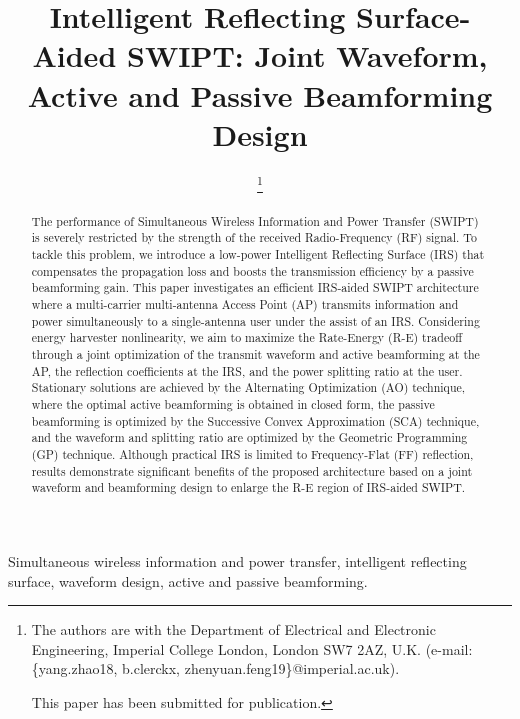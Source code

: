 \documentclass[journal]{IEEEtran}
\begin{document}
	\title{Intelligent Reflecting Surface-Aided SWIPT: Joint Waveform, Active and Passive Beamforming Design}
	\author{
		\thanks{
			The authors are with the Department of Electrical and Electronic Engineering, Imperial College London, London SW7 2AZ, U.K. (e-mail: \{yang.zhao18, b.clerckx, zhenyuan.feng19\}@imperial.ac.uk).

			This paper has been submitted for publication.
		}
	}
	\maketitle


	\begin{abstract}
		The performance of Simultaneous Wireless Information and Power Transfer (SWIPT) is severely restricted by the strength of the received Radio-Frequency (RF) signal. To tackle this problem, we introduce a low-power Intelligent Reflecting Surface (IRS) that compensates the propagation loss and boosts the transmission efficiency by a passive beamforming gain. This paper investigates an efficient IRS-aided SWIPT architecture where a multi-carrier multi-antenna Access Point (AP) transmits information and power simultaneously to a single-antenna user under the assist of an IRS. Considering energy harvester nonlinearity, we aim to maximize the Rate-Energy (R-E) tradeoff through a joint optimization of the transmit waveform and active beamforming at the AP, the reflection coefficients at the IRS, and the power splitting ratio at the user. Stationary solutions are achieved by the Alternating Optimization (AO) technique, where the optimal active beamforming is obtained in closed form, the passive beamforming is optimized by the Successive Convex Approximation (SCA) technique, and the waveform and splitting ratio are optimized by the Geometric Programming (GP) technique. Although practical IRS is limited to Frequency-Flat (FF) reflection, results demonstrate significant benefits of the proposed architecture based on a joint waveform and beamforming design to enlarge the R-E region of IRS-aided SWIPT.
	\end{abstract}


	\begin{IEEEkeywords}
		Simultaneous wireless information and power transfer, intelligent reflecting surface, waveform design, active and passive beamforming.
	\end{IEEEkeywords}
\end{document}
